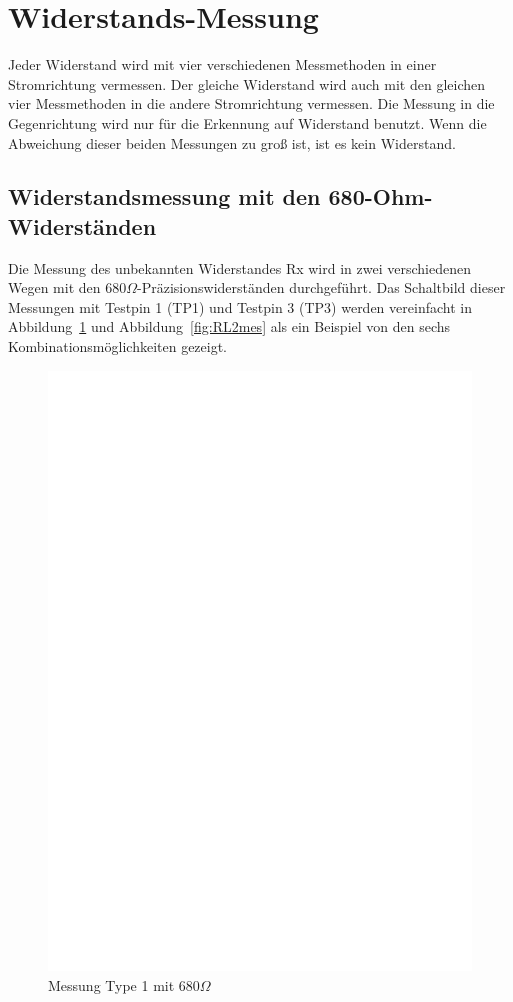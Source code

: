 \section{Widerstands-Messung}
Jeder Widerstand wird mit vier verschiedenen Messmethoden in einer Stromrichtung vermessen.
Der gleiche Widerstand wird auch mit den gleichen vier Messmethoden in die andere Stromrichtung vermessen.
Die Messung in die Gegenrichtung wird nur für die Erkennung auf Widerstand benutzt.
Wenn die Abweichung dieser beiden Messungen zu groß ist, ist es kein Widerstand.

\subsection{Widerstandsmessung mit den 680-Ohm-Widerständen}
Die Messung des unbekannten Widerstandes Rx wird in zwei verschiedenen Wegen mit den \(680\Omega\)-Präzisionswiderständen
 durchgeführt.
Das Schaltbild dieser Messungen mit Testpin 1 (TP1) und Testpin 3 (TP3) werden vereinfacht in Abbildung~\ref{fig:RL1mes} und Abbildung~\ref{fig:RL2mes} als ein Beispiel von den sechs Kombinationsmöglichkeiten gezeigt.

\begin{figure}[H]
\centering
\includegraphics[]{../FIG/ResistormessL1.eps}
\caption{Messung Type 1 mit \(680\Omega\) }
\label{fig:RL1mes}
\end{figure}

